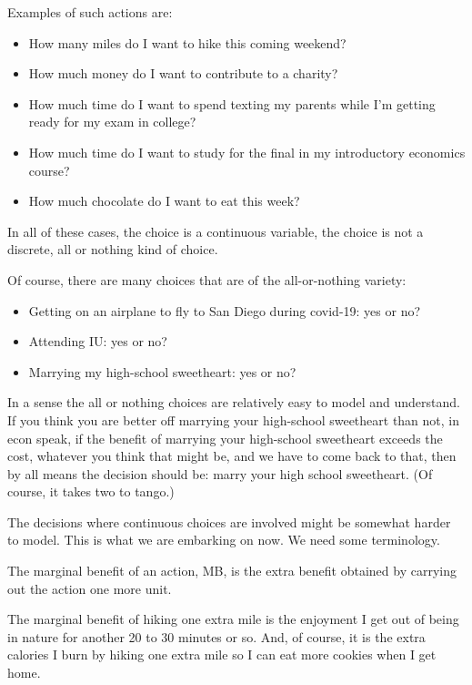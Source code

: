 \documentclass[
]{book}
\providecommand{\tightlist}{%
  \setlength{\itemsep}{0pt}\setlength{\parskip}{0pt}}
\begin{document}
Examples of such actions are:

\begin{itemize}
\tightlist
\item
  How many miles do I want to hike this coming weekend?
\item
  How much money do I want to contribute to a charity?
\item
  How much time do I want to spend texting my parents while I'm getting ready for my exam in college?
\item
  How much time do I want to study for the final in my introductory economics course?
\item
  How much chocolate do I want to eat this week?
\end{itemize}

In all of these cases, the choice is a continuous variable, the choice is not a discrete, all or nothing kind of choice.

Of course, there are many choices that are of the all-or-nothing variety:

\begin{itemize}
\tightlist
\item
  Getting on an airplane to fly to San Diego during covid-19: yes or no?
\item
  Attending IU: yes or no?
\item
  Marrying my high-school sweetheart: yes or no?
\end{itemize}

In a sense the all or nothing choices are relatively easy to model and understand. If you think you are better off marrying your high-school sweetheart than not, in econ speak, if the benefit of marrying your high-school sweetheart exceeds the cost, whatever you think that might be, and we have to come back to that, then by all means the decision should be: marry your high school sweetheart. (Of course, it takes two to tango.)

The decisions where continuous choices are involved might be somewhat harder to model. This is what we are embarking on now. We need some terminology.

The marginal benefit of an action, MB, is the extra benefit obtained by carrying out the action one more unit.

The marginal benefit of hiking one extra mile is the enjoyment I get out of being in nature for another 20 to 30 minutes or so. And, of course, it is the extra calories I burn by hiking one extra mile so I can eat more cookies when I get home.
\end{document}
